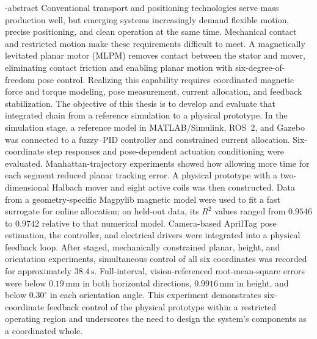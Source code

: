 
\en-abstract{
Conventional transport and positioning technologies serve mass production well, but emerging systems increasingly demand flexible motion, precise positioning, and clean operation at the same time. Mechanical contact and restricted motion make these requirements difficult to meet. A magnetically levitated planar motor (MLPM) removes contact between the stator and mover, eliminating contact friction and enabling planar motion with six-degree-of-freedom pose control. Realizing this capability requires coordinated magnetic force and torque modeling, pose measurement, current allocation, and feedback stabilization. The objective of this thesis is to develop and evaluate that integrated chain from a reference simulation to a physical prototype.
In the simulation stage, a reference model in MATLAB/Simulink, ROS~2, and Gazebo was connected to a fuzzy--PID controller and constrained current allocation. Six-coordinate step responses and pose-dependent actuation conditioning were evaluated. Manhattan-trajectory experiments showed how allowing more time for each segment reduced planar tracking error. A physical prototype with a two-dimensional Halbach mover and eight active coils was then constructed. Data from a geometry-specific Magpylib magnetic model were used to fit a fast surrogate for online allocation; on held-out data, its $R^2$ values ranged from $0.9546$ to $0.9742$ relative to that numerical model. Camera-based AprilTag pose estimation, the controller, and electrical drivers were integrated into a physical feedback loop. After staged, mechanically constrained planar, height, and orientation experiments, simultaneous control of all six coordinates was recorded for approximately $38.4\,\mathrm{s}$. Full-interval, vision-referenced root-mean-square errors were below $0.19\,\mathrm{mm}$ in both horizontal directions, $0.9916\,\mathrm{mm}$ in height, and below $0.30^\circ$ in each orientation angle. This experiment demonstrates six-coordinate feedback control of the physical prototype within a restricted operating region and underscores the need to design the system's components as a coordinated whole.
}
